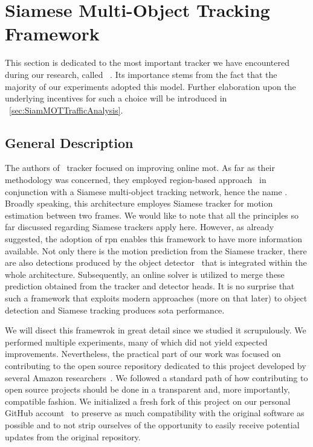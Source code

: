 \section{Siamese Multi-Object Tracking Framework}
\label{sec:SiamMOT}

This section is dedicated to the most important tracker we have encountered during our research, called \siammot{}~\cite{shuai2021siammot}. Its importance stems from the fact that the majority of our experiments adopted this model. Further elaboration upon the underlying incentives for such a choice will be introduced in \sectiontext{}~\ref{sec:SiamMOTTrafficAnalysis}.

\subsection{General Description}

The authors of~\cite{shuai2021siammot} tracker focused on improving online \gls{mot}. As far as their methodology was concerned, they employed region-based approach~\cite{ren2017fasterrcnn} in conjunction with a Siamese multi-object tracking network, hence the name \siammot{}. Broadly speaking, this architecture employes Siamese tracker for motion estimation between two frames. We would like to note that all the principles so far discussed regarding Siamese trackers apply here. However, as already suggested, the adoption of \gls{rpn} enables this framework to have more information available. Not only there is the motion prediction from the Siamese tracker, there are also detections produced by the \fasterrcnn{} object detector~\cite{ren2017fasterrcnn} that is integrated within the whole architecture. Subsequently, an online solver is utilized to merge these prediction obtained from the tracker and detector heads. It is no surprise that such a framework that exploits modern approaches (more on that later) to object detection and Siamese tracking produces \gls{sota} performance.

We will disect this framewrok in great detail since we studied it scrupulously. We performed multiple experiments, many of which did not yield expected improvements. Nevertheless, the practical part of our work was focused on contributing to the open source repository dedicated to this project developed by several Amazon researchers~\cite{websiammotoriggithub}. We followed a standard path of how contributing to open source projects should be done in a transparent and, more importantly, compatible fashion. We initialized a fresh fork of this project on our personal GitHub account~\cite{websiammotforkgithub} to preserve as much compatibility with the original software as possible and to not strip ourselves of the opportunity to easily receive potential updates from the original repository.


